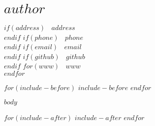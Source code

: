 \documentclass[$if(fontsize)$$fontsize$,$endif$$if(lang)$$lang$,$endif$$if(papersize)$$papersize$,$endif$$for(classoption)$$classoption$$sep$,$endfor$]{$documentclass$}
\begin{document}
\section{$author$}\label{author}

$if(address)$
\textcolor{sectiongray}{\faMap} \(~\) $address$\\
$endif$
$if(phone)$
\textcolor{sectiongray}{\faPhone} \(~\) $phone$\\
$endif$
$if(email)$
\textcolor{sectiongray}{\faEnvelope} \(~\) $email$\\
$endif$
$if(github)$
\textcolor{sectiongray}{\faGithub} \(~\) $github$\\
$endif$
$for(www)$
\textcolor{sectiongray}{\faGlobe} \(~\) $www$\\
$endfor$





$for(include-before)$
$include-before$
$endfor$

$body$

$for(include-after)$
$include-after$
$endfor$
\end{document}
